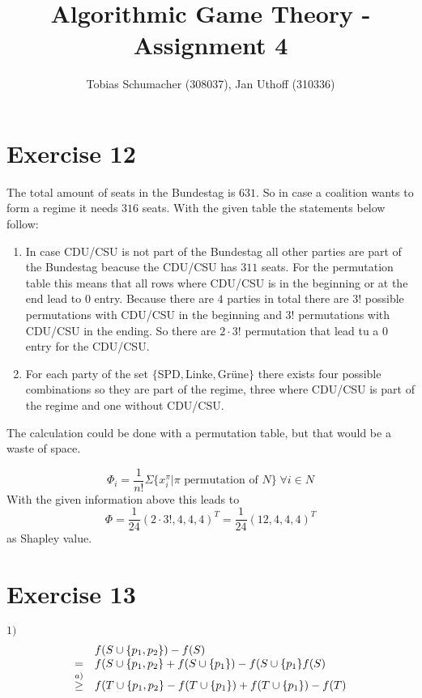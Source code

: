 \documentclass[10pt]{article}
\title{Algorithmic Game Theory - Assignment 4}
\author{Tobias Schumacher (308037), Jan Uthoff (310336)}
\begin{document}
\maketitle

\section*{Exercise 12}
The total amount of seats in the Bundestag is $631$. So in case a coalition wants
to form a regime it needs $316$ seats. With the given table the statements below
follow:
\begin{enumerate}
  \item In case CDU/CSU is not part of the Bundestag all other parties are part
  of the Bundestag beacuse the CDU/CSU has $311$ seats. For the permutation table
  this means that all rows where
  CDU/CSU is in the beginning or at the end lead to $0$ entry. Because there are
  $4$ parties in total there are $3!$ possible permutations with CDU/CSU in the
  beginning and $3!$ permutations with CDU/CSU in the ending. So there are
  $2\cdot 3!$ permutation that lead tu a $0$ entry for the CDU/CSU.
  \item For each party of the set $\{$SPD$,$Linke$,$Grüne$\}$ there exists four
  possible combinations so they are part of the regime, three where CDU/CSU is
  part of the regime and one without CDU/CSU.
\end{enumerate}
The calculation could be done with a permutation table, but that would be a
waste of space.

\begin{displaymath}
  \Phi_{i}=\frac{1}{n!}\Sigma\{x^{\pi}_{i}|\pi \text{ permutation of
  }N\}\;\forall i\in N
\end{displaymath}
With the given information above this leads to
\begin{displaymath}
  \Phi=\frac{1}{24}(2\cdot 3!, 4, 4, 4)^{T}=\frac{1}{24}(12, 4, 4, 4)^{T}
\end{displaymath}
as Shapley value.


\section*{Exercise 13}

$1)$
\begin{displaymath}
  \begin{array}{c l}
    & f(S\cup \{p_1,p_2\}) - f(S) \\
    = & f(S \cup \{p_1,p_2\} + f(S\cup \{p_1\}) - f(S\cup \{p_1\} f(S) \\
    \overset{a)}{\geq} & f(T\cup \{p_1,p_2\} - f(T\cup \{p_1\}) + f(T\cup
    \{p_1\}) - f(T)
  \end{array}
\end{displaymath}
\end{document}
